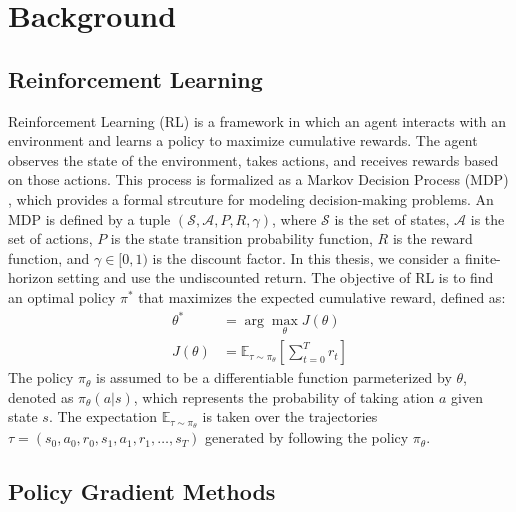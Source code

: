
\chapter{Background}\label{chapter2}

\section{Reinforcement Learning} \label{chap2:sec1}

Reinforcement Learning (RL) is a framework in which an agent interacts with an environment and learns a policy to maximize cumulative rewards.
The agent observes the state of the environment, takes actions, and receives rewards based on those actions.
This process is formalized as a Markov Decision Process (MDP) \cite{MDP}, which provides a formal strcuture for modeling decision-making problems.
An MDP is defined by a tuple \((\mathcal{S}, \mathcal{A}, P, R, \gamma)\), where $\mathcal{S}$ is the set of states, $\mathcal{A}$ is the set of actions, $P$ is the state transition probability function, $R$ is the reward function, and $\gamma \in [0, 1)$ is the discount factor.
In this thesis, we consider a finite-horizon setting and use the undiscounted return.
The objective of RL is to find an optimal policy $\pi^*$ that maximizes the expected cumulative reward, defined as:
\begin{equation}
  \begin{aligned}
    \theta^* &= \arg\max_\theta J(\theta) \\
    J(\theta) &= \mathbb{E}_{\tau \sim \pi_\theta} \left[\sum^T_{t = 0} r_t \right]
  \end{aligned}
\end{equation}
The policy $\pi_\theta$ is assumed to be a differentiable function parmeterized by $\theta$, denoted as $\pi_\theta(a|s)$, which represents the probability of taking ation $a$ given state $s$.
The expectation $\mathbb{E}_{\tau \sim \pi_\theta}$ is taken over the trajectories $\tau = (s_0, a_0, r_0, s_1, a_1, r_1, \ldots, s_T)$ generated by following the policy $\pi_\theta$.

\section{Policy Gradient Methods} \label{chap2:sec2}

